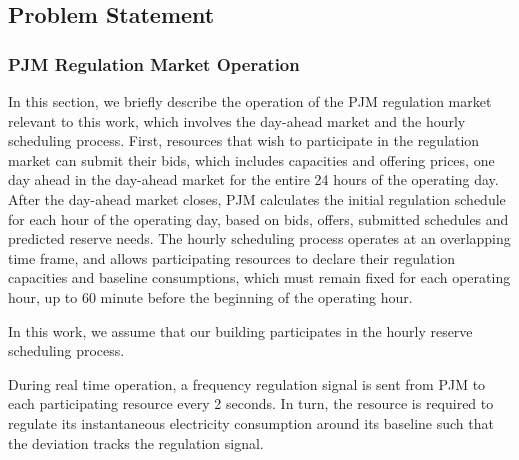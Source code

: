 %
%


\subsection{Problem Statement}
\label{sec:problem_statement}


\subsubsection{PJM Regulation Market Operation }

In this section, we briefly describe the operation of the PJM regulation market relevant to this work, which involves the day-ahead market and the hourly scheduling process.
First, resources that wish to participate in the regulation market can submit their bids, which includes capacities and offering prices, one day ahead in the day-ahead market for the entire 24 hours of the operating day. 
After the day-ahead market closes, PJM calculates the initial regulation schedule for each hour of the operating day, based on bids, offers, submitted schedules and predicted reserve needs. %
The hourly scheduling process operates at an overlapping time frame, and allows participating resources to declare their regulation capacities and baseline consumptions, which must remain fixed for each operating hour, up to 60 minute before the beginning of the operating hour.
\begin{assumption}
In this work, we assume that our building participates in the hourly reserve scheduling process.
\end{assumption}

During real time operation, a frequency regulation signal is sent from PJM to each participating resource every 2 seconds. In turn, the resource is required to regulate its instantaneous electricity consumption around its baseline such that the deviation tracks the regulation signal.

